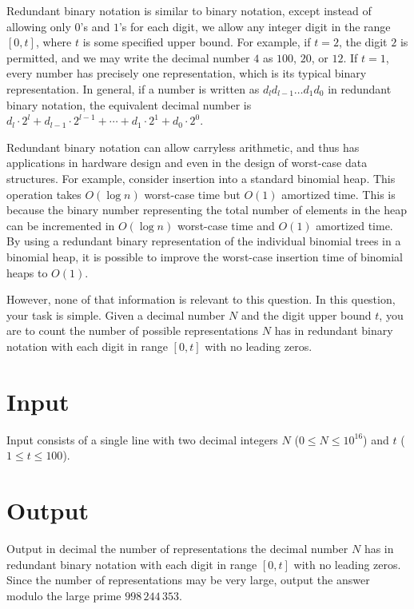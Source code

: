 
Redundant binary notation is similar to binary notation, except instead of allowing only $0$’s and $1$’s for each digit, we allow any integer digit in the range $[0, t]$, where $t$ is some specified upper bound. For example, if $t = 2$, the digit $2$ is permitted, and we may write the decimal number $4$ as $100$, $20$, or $12$. If $t=1$, every number has precisely one representation, which is its typical binary representation. In general, if a number is written as $d_l d_{l-1} \ldots d_1 d_0$ in redundant binary notation, the equivalent decimal number is $d_l\cdot2^l + d_{l-1}\cdot2^{l-1} + \cdots + d_1\cdot2^1 + d_0\cdot2^0$.

Redundant binary notation can allow carryless arithmetic, and thus has applications in hardware design and even in the design of worst-case data structures. For example, consider insertion into a standard binomial heap. This operation takes $O(\log n)$ worst-case time but $O(1)$ amortized time. This is because the binary number representing the total number of elements in the heap can be incremented in $O(\log n)$ worst-case time and $O(1)$ amortized time. By using a redundant binary representation of the individual binomial trees in a binomial heap, it is possible to improve the worst-case insertion time of binomial heaps to $O(1)$.

However, none of that information is relevant to this question. In this question, your task is simple. Given a decimal number $N$ and the digit upper bound $t$, you are to count the number of possible representations $N$ has in redundant binary notation with each digit in range $[0, t]$ with no leading zeros.

\section*{Input}

Input consists of a single line with two decimal integers $N$ ($0 \leq N \leq 10^{16}$) and $t$ ($1 \leq t \leq 100$).


\section*{Output}

Output in decimal the number of representations the decimal number $N$ has in redundant binary notation with each digit in range $[0, t]$ with no leading zeros. Since the number of representations may be very large, output the answer modulo the large prime $998\,244\,353$.